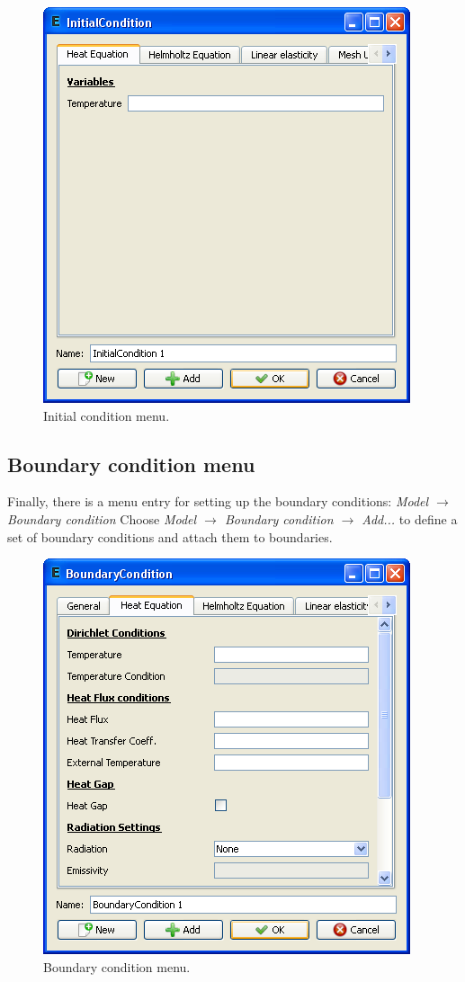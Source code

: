 \documentclass[a4paper,12pt]{article}
\newcommand{\menu}[2]{{\it \vskip2mm #1 $\rightarrow$ #2 \vskip2mm}}
\newcommand{\dynmenu}[3]{{\it \vskip2mm #1 $\rightarrow$ #2 $\rightarrow$ #3 \vskip2mm}}
\begin{document}
\begin{figure}[ht]
\begin{center}
 \includegraphics[scale=0.5]{images/initialcondition.png}
\caption{Initial condition menu.}
\end{center}
\end{figure}

\subsection{Boundary condition menu}

Finally, there is a menu entry for setting up the boundary conditions:
\menu{Model}{Boundary condition}
\noindent Choose
\dynmenu{Model}{Boundary condition}{Add...}
\noindent to define a set of boundary conditions and attach them to boundaries.

\begin{figure}[ht]
\begin{center}
 \includegraphics[scale=0.5]{images/boundarycondition.png}
\caption{Boundary condition menu.}
\end{center}
\end{figure}
\end{document}
